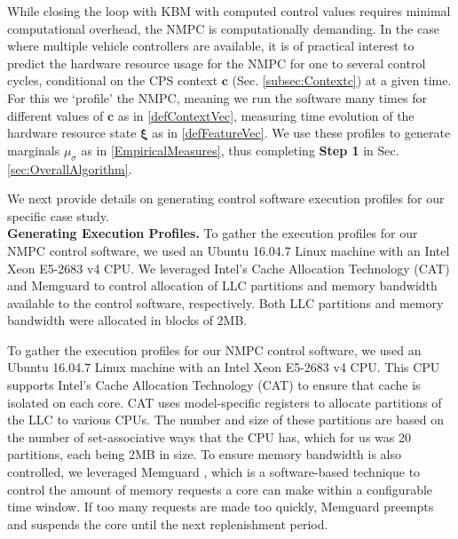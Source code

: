 \documentclass[letterpaper, 10pt, twocolumn]{ieeeconf}      %
\begin{document}



While closing the loop with KBM  with computed control values requires minimal computational overhead, the NMPC is computationally demanding. In the case where multiple vehicle controllers are available, it is of practical interest to predict the hardware resource usage for the NMPC for one to several control cycles, conditional on the CPS context $\bm{c}$ (Sec. \ref{subsec:Contextc}) at a given time. For this we `profile' the NMPC, meaning we run the software many times for different values of $\bm{c}$ as in \eqref{defContextVec}, measuring time evolution of the hardware resource state $\bm{\xi}$ as in \eqref{defFeatureVec}. We use these profiles to generate marginals $\mu_{\sigma}$ as in \eqref{EmpiricalMeasures}, thus completing \textbf{Step 1} in Sec. \ref{sec:OverallAlgorithm}.

We next provide details on generating control software execution profiles for our specific case study.\\ 
\noindent\textbf{Generating Execution Profiles.}  To gather the execution profiles for our NMPC control software, we used an Ubuntu 16.04.7 Linux machine with an Intel Xeon E5-2683 v4 CPU.
We leveraged Intel’s Cache Allocation Technology (CAT) \cite{intel-2015-cat} and Memguard \cite{Yun16-memguard-journal} to control allocation of LLC partitions and memory bandwidth available to the control software, respectively. Both LLC partitions and memory bandwidth were allocated in blocks of 2MB.

To gather the execution profiles for our NMPC control software, we used an Ubuntu 16.04.7 Linux machine with an Intel Xeon E5-2683 v4 CPU.
This CPU supports Intel’s Cache Allocation Technology (CAT) \cite{intel-2015-cat} to ensure that cache is isolated on each core.
CAT uses model-specific registers to allocate partitions of the LLC to various CPUs.
The number and size of these partitions are based on the number of set-associative ways that the CPU has, which for us was 20 partitions, each being 2MB in size.
To ensure memory bandwidth is also controlled, we leveraged Memguard \cite{Yun16-memguard-journal}, which is a software-based technique to control the amount of memory requests a core can make within a configurable time window.
If too many requests are made too quickly, Memguard preempts and suspends the core until the next replenishment period.
\fi
\end{document}
